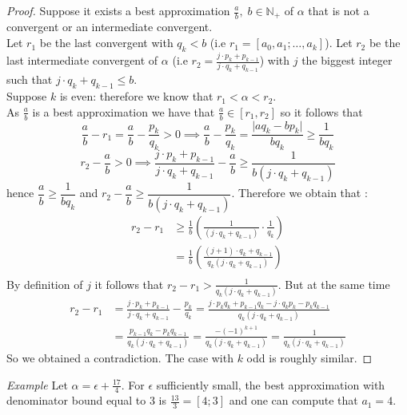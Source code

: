 \documentclass[a4paper,11pt,american]{article}
\newcommand{\N}{\mathbb{N}}
\theoremstyle{plain}
\theoremstyle{definition}
\begin{document}
\begin{proof}
    Suppose it exists a best approximation $\frac{a}{b},\; b\in\N_+$  of $\alpha$ that is not a convergent or an intermediate convergent.\\
    Let $r_1$ be the last convergent with $q_k<b$ (i.e $r_1=[a_0,a_1;\dots,a_k]$). Let $r_2$ be the last intermediate convergent of $\alpha$ (i.e $r_2=\frac{j\cdot p_k+p_{k-1}}{j\cdot q_k+q_{k-1}}$) with $j$ the biggest integer such that $j\cdot q_k+q_{k-1}\leq b$.\\
    Suppose $k$ is even: therefore we know that $r_1<\alpha<r_2$.\\
    As $\frac{a}{b}$ is a best approximation we have that $\frac{a}{b}\in [r_1,r_2]$ so it follows that 
    \begin{equation}
        \frac{a}{b}-r_1=\frac{a}{b}-\frac{p_k}{q_k}>0\implies \frac{a}{b}-\frac{p_k}{q_k}=\frac{\vert a q_k-b p_k\vert}{b q_k}\geq \frac{1}{bq_k}
    \end{equation}
    \begin{equation}r_2-\frac{a}{b}>0\implies \frac{j\cdot p_k+p_{k-1}}{j\cdot q_k+q_{k-1}}-\frac{a}{b}\geq \frac{1}{b(j\cdot q_k+q_{k-1})}
    \end{equation}
    hence $\dfrac{a}{b}\geq \dfrac{1}{bq_k}$ and $r_2-\dfrac{a}{b}\geq \dfrac{1}{b(j\cdot q_k+q_{k-1})}$. Therefore we obtain that :\begin{align*}
        r_2-r_1&\geq \frac{1}{b}(\frac{1}{(j\cdot q_k+q_{k-1})}\cdot \frac{1}{q_k})\\
        &=\frac{1}{b}(\frac{(j+1)\cdot q_k+q_{k-1}}{q_k(j\cdot q_k+q_{k-1})})\\
    \end{align*}
    By definition of $j$ it follows that $r_2-r_1>\frac{1}{q_k(j\cdot q_k+q_{k-1})}$.
    But at the same time\begin{align*}
        r_2-r_1&= \frac{j\cdot p_k+p_{k-1}}{j\cdot q_k+q_{k-1}}-\frac{p_k}{q_k}=\frac{j\cdot p_kq_k+p_{k-1}q_k-j\cdot q_kp_k-p_kq_{k-1}}{q_k(j\cdot q_k+q_{k-1})}\\
        &=\frac{p_{k-1}q_k-p_kq_{k-1}}{q_k(j\cdot q_k+q_{k-1})}=\frac{-(-1)^{k+1}}{q_k(j\cdot q_k+q_{k-1})}=\frac{1}{q_k(j\cdot q_k+q_{k-1})}
    \end{align*}
    So we obtained a contradiction. The case with $k$ odd is roughly similar.
\end{proof}
\emph{Example} Let $\alpha=\epsilon+\frac{17}{4}$. For $\epsilon$ sufficiently small, the best approximation with denominator bound equal to 3 is $\frac{13}{3}=[4;3]$ and one can compute that $a_1=4$.
\end{document}
